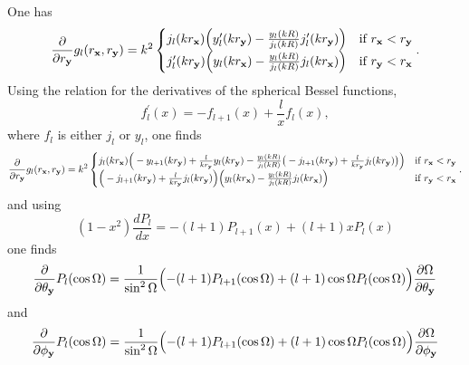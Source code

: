 One has 
\[
\frac{\partial}{\partial r_{\bf y}}g_l(r_{\bf x},r_{\bf y})
=
k^2\begin{cases}
j_l(kr_{\bf x})\Big(y_l^\prime(kr_{\bf y})-\frac{y_l(kR)}{j_l(kR)}j_l^\prime(kr_{\bf y})\Big) & \text{if } r_{\bf x}<r_{\bf y}\\
j_l^\prime(kr_{\bf y})\Big(y_l(kr_{\bf x})-\frac{y_l(kR)}{j_l(kR)}j_l(kr_{\bf x})\Big) & \text{if } r_{\bf y}<r_{\bf x}
\end{cases}.
\]
Using the relation for the derivatives of the spherical Bessel functions, 
\[
f_l^\prime(x)=-f_{l+1}(x)+\frac{l}{x}f_l(x),
\]
where $f_l$ is either $j_l$ or $y_l$, one finds 
\[
\frac{\partial}{\partial r_{\bf y}}g_l(r_{\bf x},r_{\bf y})
=
k^2\begin{cases}
j_l(kr_{\bf x})\Big(-y_{l+1}(kr_{\bf y})+\frac{l}{kr_{\bf y}}y_l(kr_{\bf y})-\frac{y_l(kR)}{j_l(kR)}\big(-j_{l+1}(kr_{\bf y})+\frac{l}{kr_{\bf y}}j_l(kr_{\bf y})\big)\Big) & \text{if } r_{\bf x}<r_{\bf y}\\
\Big(-j_{l+1}(kr_{\bf y})+\frac{l}{kr_{\bf y}}j_l(kr_{\bf y})\Big)
\Big(y_l(kr_{\bf x})-\frac{y_l(kR)}{j_l(kR)}j_l(kr_{\bf x})\Big) & \text{if } r_{\bf y}<r_{\bf x}
\end{cases}.
\]
and using 
\[
(1-x^2)\frac{dP_l}{dx}={-(l+1)P_{l+1}(x)+(l+1)xP_l(x)}
\]
one finds
\[
\frac{\partial}{\partial \theta_{\bf y}}P_l(\cos\Omega)
=
\frac{1}{\sin^2\Omega}\Big({-(l+1)P_{l+1}(\cos\Omega)+(l+1)\cos\Omega P_l(\cos\Omega)}\Big)
\frac{\partial\Omega}{\partial \theta_{\bf y}}
\]
and
\[
\frac{\partial}{\partial \phi_{\bf y}}P_l(\cos\Omega)
=
\frac{1}{\sin^2\Omega}\Big({-(l+1)P_{l+1}(\cos\Omega)+(l+1)\cos\Omega P_l(\cos\Omega)}\Big)
\frac{\partial\Omega}{\partial \phi_{\bf y}}
\]
